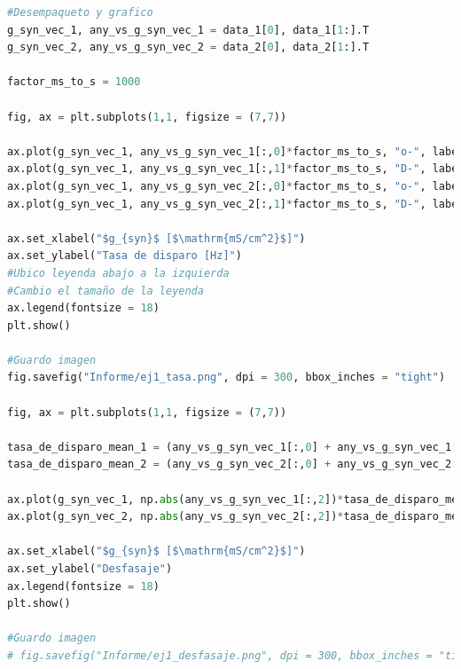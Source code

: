 \documentclass[aps,prb,twocolumn,superscriptaddress,floatfix,longbibliography]{revtex4-2}
\begin{document}
\begin{lstlisting}[language=Python]
#Desempaqueto y grafico
g_syn_vec_1, any_vs_g_syn_vec_1 = data_1[0], data_1[1:].T
g_syn_vec_2, any_vs_g_syn_vec_2 = data_2[0], data_2[1:].T

factor_ms_to_s = 1000

fig, ax = plt.subplots(1,1, figsize = (7,7))

ax.plot(g_syn_vec_1, any_vs_g_syn_vec_1[:,0]*factor_ms_to_s, "o-", label = r"$V_1$ - $V_{syn}$ = 0 mV", alpha = 0.5, color = "tab:blue")
ax.plot(g_syn_vec_1, any_vs_g_syn_vec_1[:,1]*factor_ms_to_s, "D-", label = r"$V_2$ - $V_{syn}$ = 0 mV", alpha = 0.5, color = "tab:cyan")
ax.plot(g_syn_vec_1, any_vs_g_syn_vec_2[:,0]*factor_ms_to_s, "o-", label = r"$V_1$ - $V_{syn}$ = -80 mV", alpha = 0.5, color = "tab:red")
ax.plot(g_syn_vec_1, any_vs_g_syn_vec_2[:,1]*factor_ms_to_s, "D-", label = r"$V_2$ - $V_{syn}$ = -80 mV", alpha = 0.5, color = "tab:orange")

ax.set_xlabel("$g_{syn}$ [$\mathrm{mS/cm^2}$]")
ax.set_ylabel("Tasa de disparo [Hz]")
#Ubico leyenda abajo a la izquierda
#Cambio el tamaño de la leyenda
ax.legend(fontsize = 18)
plt.show()

#Guardo imagen
fig.savefig("Informe/ej1_tasa.png", dpi = 300, bbox_inches = "tight")

fig, ax = plt.subplots(1,1, figsize = (7,7))

tasa_de_disparo_mean_1 = (any_vs_g_syn_vec_1[:,0] + any_vs_g_syn_vec_1[:,1])/2
tasa_de_disparo_mean_2 = (any_vs_g_syn_vec_2[:,0] + any_vs_g_syn_vec_2[:,1])/2

ax.plot(g_syn_vec_1, np.abs(any_vs_g_syn_vec_1[:,2])*tasa_de_disparo_mean_1, "o-", label = "$V_{syn}$ = 0 mV", color = "tab:cyan")
ax.plot(g_syn_vec_2, np.abs(any_vs_g_syn_vec_2[:,2])*tasa_de_disparo_mean_2, "o-", label = "$V_{syn}$ = -80 mV", color = "tab:orange")

ax.set_xlabel("$g_{syn}$ [$\mathrm{mS/cm^2}$]")
ax.set_ylabel("Desfasaje")
ax.legend(fontsize = 18)
plt.show()

#Guardo imagen
# fig.savefig("Informe/ej1_desfasaje.png", dpi = 300, bbox_inches = "tight")

\end{lstlisting}
    

% 
\end{document}

